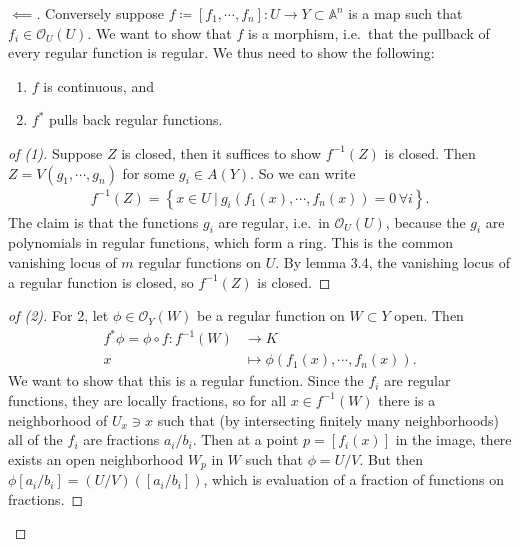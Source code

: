 \begin{proof}[$\impliedby$]

Conversely suppose
\(f \coloneqq{\left[ {f_1, \cdots, f_n} \right]}: U\to Y \subset {\mathbb{A}}^n\)
is a map such that \(f_i \in {\mathcal{O}}_U(U)\). We want to show that
\(f\) is a morphism, i.e.~that the pullback of every regular function is
regular. We thus need to show the following:

\begin{claim}

\envlist

\begin{enumerate}
\def\labelenumi{\arabic{enumi}.}
\tightlist
\item
  \(f\) is continuous, and
\item
  \(f^*\) pulls back regular functions.
\end{enumerate}

\end{claim}

\begin{proof}[of (1)]

Suppose \(Z\) is closed, then it suffices to show \(f^{-1} (Z)\) is
closed. Then \(Z = V(g_1, \cdots, g_n)\) for some \(g_i \in A(Y)\). So
we can write
\begin{align*}  
f^{-1} (Z) = \left\{{
x\in U {~\mathrel{\Big|}~}g_i(f_1(x), \cdots, f_n(x)  ) = 0\, \forall i
}\right\}
.\end{align*}
The claim is that the functions \(g_i\) are regular, i.e.~in
\({\mathcal{O}}_U(U)\), because the \(g_i\) are polynomials in regular
functions, which form a ring. This is the common vanishing locus of
\(m\) regular functions on \(U\). By lemma 3.4, the vanishing locus of a
regular function is closed, so \(f^{-1} (Z)\) is closed.

\end{proof}

\begin{proof}[of (2)]

For 2, let \(\phi \in {\mathcal{O}}_Y(W)\) be a regular function on
\(W\subset Y\) open. Then
\begin{align*}  
f^* \phi  = \phi \circ f: f^{-1} (W) &\to K \\
x &\mapsto \phi(f_1(x), \cdots, f_n(x))
.\end{align*}
We want to show that this is a regular function. Since the \(f_i\) are
regular functions, they are locally fractions, so for all
\(x\in f^{-1} (W)\) there is a neighborhood of \(U_x\ni x\) such that
(by intersecting finitely many neighborhoods) all of the \(f_i\) are
fractions \(a_i/b_i\). Then at a point \(p = {\left[ {f_i(x)} \right]}\)
in the image, there exists an open neighborhood \(W_p\) in \(W\) such
that \(\phi = U/V\). But then
\(\phi{{\left[ {a_i /b_i} \right]}} = (U/V)({\left[ {a_i/b_i} \right]})\),
which is evaluation of a fraction of functions on fractions.

\end{proof}

\end{proof}

